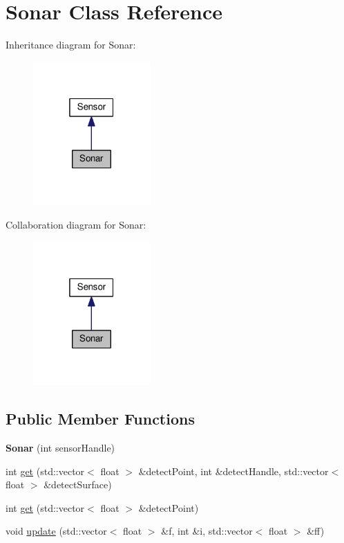 \hypertarget{classSonar}{}\section{Sonar Class Reference}
\label{classSonar}


Inheritance diagram for Sonar\+:\nopagebreak
\begin{figure}[H]
\begin{center}
\leavevmode
\includegraphics[width=127pt]{classSonar__inherit__graph}
\end{center}
\end{figure}


Collaboration diagram for Sonar\+:\nopagebreak
\begin{figure}[H]
\begin{center}
\leavevmode
\includegraphics[width=127pt]{classSonar__coll__graph}
\end{center}
\end{figure}
\subsection*{Public Member Functions}
\begin{DoxyCompactItemize}
\item 
{\bfseries Sonar} (int sensor\+Handle)\hypertarget{classSonar_ae6edd4f329f9892a64c5f0cab808c7a2}{}\label{classSonar_ae6edd4f329f9892a64c5f0cab808c7a2}

\item 
int \hyperlink{classSonar_a6881d0c104c0fafad95ad1aea917b6f3}{get} (std\+::vector$<$ float $>$ \&detect\+Point, int \&detect\+Handle, std\+::vector$<$ float $>$ \&detect\+Surface)
\item 
int \hyperlink{classSonar_af77f9c5b9db42276b06b3b044c738284}{get} (std\+::vector$<$ float $>$ \&detect\+Point)
\item 
void \hyperlink{classSonar_ab32f714b0c5412e64ec60997467074bc}{update} (std\+::vector$<$ float $>$ \&f, int \&i, std\+::vector$<$ float $>$ \&ff)
\end{DoxyCompactItemize}
